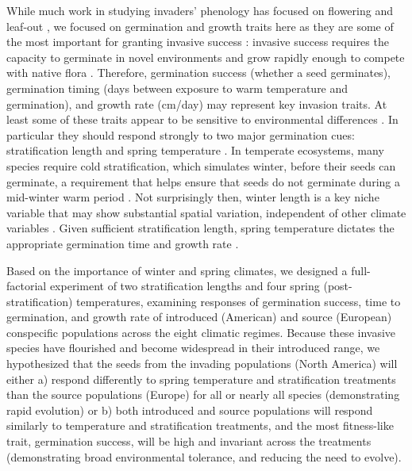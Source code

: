 \documentclass[11pt]{article}\usepackage[]{graphicx}\usepackage[]{color}
\begin{document}
While much work in studying invaders' phenology has focused on flowering and leaf-out \parencite[e.g.,][]{Zohner2017}, we focused on germination and growth traits here as they are some of the most important for granting invasive success \parencite{Sattin1997, Maillet2000}: invasive success requires the capacity to germinate in novel environments and grow rapidly enough to compete with native flora \parencite{Grime1988, Gioria2017}. Therefore, germination success (whether a seed germinates), germination timing (days between exposure to warm temperature and germination), and growth rate (cm/day) may represent key invasion traits. At least some of these traits appear to be sensitive to environmental differences \parencite{Leger2007}.  In particular they should respond strongly to two major germination cues: stratification length and spring temperature \parencite{Finch2006}. In temperate ecosystems, many species require cold stratification, which simulates winter, before their seeds can germinate, a requirement that helps ensure that seeds do not germinate during a mid-winter warm period \parencite{Baskin1998,Popay1970,Wulff1994}. Not surprisingly then, winter length is a key niche variable \parencite{Harte2015} that may show substantial spatial variation, independent of other climate variables \parencite{Bonan2003}. Given sufficient stratification length, spring temperature dictates the appropriate germination time and growth rate \parencite{Egli1980,Guilioni2003}. 

Based on the importance of winter and spring climates, we designed a full-factorial experiment of two stratification lengths and four spring (post-stratification) temperatures, examining responses of germination success, time to germination, and growth rate of introduced (American) and source (European) conspecific populations across the eight climatic regimes. Because these invasive species have flourished and become widespread in their introduced range, we hypothesized that the seeds from the invading populations (North America) will either a) respond differently to spring temperature and stratification treatments than the source populations (Europe) for all or nearly all species (demonstrating rapid evolution) or b) both introduced and source populations will respond similarly to temperature and stratification treatments, and the most fitness-like trait, germination success, will be high and invariant across the treatments (demonstrating broad environmental tolerance, and reducing the need to evolve). %
\end{document}
